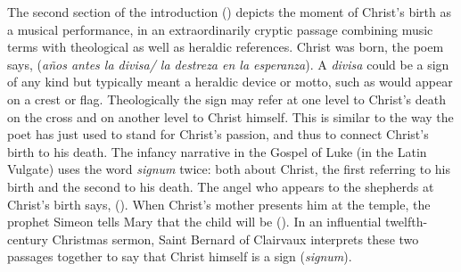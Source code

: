 The second section of the introduction () depicts the moment
of Christ's birth as a musical performance, in an extraordinarily cryptic
passage combining music terms with theological as well as heraldic references.
Christ was born, the poem says,  (\emph{años antes la divisa/ la destreza en la esperanza}).
A \emph{divisa} could be a sign of any kind but typically meant a heraldic
device or motto, such as would appear on a crest or flag.%
    \Autocite
    [: .]
    {Covarrubias:Tesoro}
Theologically the sign may refer at one level to Christ's death on the cross and
on another level to Christ himself.
This is similar to the way the poet has just used  to
stand for Christ's passion, and thus to connect Christ's birth to his death.
The infancy narrative in the Gospel of Luke (in the Latin Vulgate) uses the word
\emph{signum} twice: both about Christ, the first referring to his birth and the
second to his death.
The angel who appears to the shepherds at Christ's birth says,  ().
When Christ's mother presents him at the temple, the prophet Simeon tells Mary
that the child will be  ().
In an influential twelfth-century Christmas sermon, Saint Bernard of Clairvaux
interprets these two passages together to say that Christ himself is a sign
(\emph{signum}).%
    \Autocite[Sermo 4, 126C]{Bernard:Nativitate}

